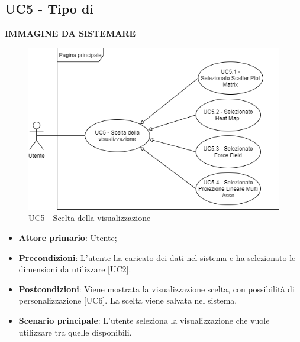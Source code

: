 \subsection{UC5 - Tipo di }
\textbf{IMMAGINE DA SISTEMARE}
\begin{figure}[h]
\includegraphics[width=\linewidth]{Section/Images/UC5.png}
\centering
\caption{UC5 - Scelta della visualizzazione}
\end{figure}
\begin{itemize}
	\item \textbf{Attore primario}: Utente;
	\item \textbf{Precondizioni}: L'utente ha caricato dei dati nel sistema e ha selezionato le dimensioni da utilizzare [UC2].
	\item \textbf{Postcondizioni}: Viene mostrata la visualizzazione scelta, con possibilità di personalizzazione [UC6]. La scelta viene salvata nel sistema.
	\item \textbf{Scenario principale}: L'utente seleziona la visualizzazione che vuole utilizzare tra quelle disponibili.

\end{itemize}